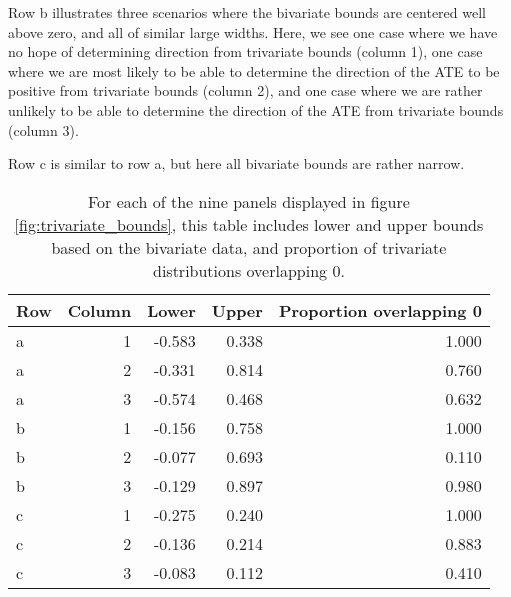 \documentclass[
]{article}
\theoremstyle{plain}
\begin{document}
Row b illustrates three scenarios where the bivariate bounds are centered well above zero, and all of similar large widths. Here, we see one case where we have no hope of determining direction from trivariate bounds (column 1), one case where we are most likely to be able to determine the direction of the ATE to be positive from trivariate bounds (column 2), and one case where we are rather unlikely to be able to determine the direction of the ATE from trivariate bounds (column 3).

Row c is similar to row a, but here all bivariate bounds are rather narrow.

\begin{table}[h]
  \center
  
\begin{tabular}{l|r|r|r|r}
\hline
Row & Column & Lower & Upper & Proportion overlapping 0\\
\hline
a & 1 & -0.583 & 0.338 & 1.000\\
\hline
a & 2 & -0.331 & 0.814 & 0.760\\
\hline
a & 3 & -0.574 & 0.468 & 0.632\\
\hline
b & 1 & -0.156 & 0.758 & 1.000\\
\hline
b & 2 & -0.077 & 0.693 & 0.110\\
\hline
b & 3 & -0.129 & 0.897 & 0.980\\
\hline
c & 1 & -0.275 & 0.240 & 1.000\\
\hline
c & 2 & -0.136 & 0.214 & 0.883\\
\hline
c & 3 & -0.083 & 0.112 & 0.410\\
\hline
\end{tabular}


  \caption{For each of the nine panels displayed in figure \ref{fig:trivariate_bounds}, this table includes lower and upper bounds based on the bivariate data, and proportion of trivariate distributions overlapping 0.}
  \label{tab:subset_plot_summaries_a}
\end{table}
\end{document}
